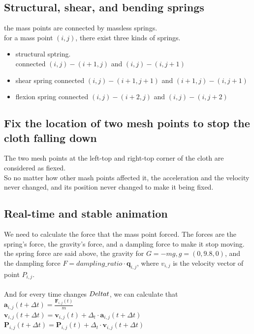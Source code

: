 \documentclass[acmtog]{acmart}
\begin{document}
\subsection{Structural, shear, and bending springs}
the mass points are connected by massless springs.\\
for a mass point $(i,j)$, there exist three kinds of springs.
\begin{itemize}
	\item structural sptring.\\
		connected $(i,j)-(i+1,j)$ and $(i,j)-(i,j+1)$ \\
	\item shear spring
		connected $(i,j)-(i+1,j+1)$ and $(i+1,j)-(i,j+1)$\\ 

	\item flexion spring
		connected $(i,j)-(i+2,j)$ and $(i,j)-(i,j+2)$\\ 
\end{itemize}

\subsection{Fix the location of two mesh points to stop the cloth falling down}
The two mesh points at the left-top and right-top corner of the cloth are considered as fiexed.\\
So no matter how other mash points affected it, the acceleration and the velocity never changed, and its position never changed
to make it being fixed.\\

\subsection{Real-time and stable animation}
We need to calculate the force that the mass point forced. The forces are the spring's force, the gravity's force, and a dampling force to make it stop moving.\\
the spring force are said above, the gravity for $G = -mg, g=(0,9.8,0)$, and the dampling force $F = dampling\_ratio \cdot \mathbf{q}_{i,j}$,
where $v_{i,j}$ is the velocity vector of point $P_{i,j}$.\\\\
And for every time changes $\\Delta t$, we can calculate that\\
$\mathbf{a}_{i,j}(t+\Delta t) = \frac{\mathbf{F}_{i,j}(t)}{m}$\\
$\mathbf{v}_{i,j}(t+\Delta t) = \mathbf{v}_{i,j}(t) + \Delta_t\cdot \mathbf{a}_{i,j}(t + \Delta t)$\\
$\mathbf{P}_{i,j}(t+\Delta t) = \mathbf{P}_{i,j}(t) + \Delta_t\cdot \mathbf{v}_{i,j}(t + \Delta t)$\\
\end{document}
